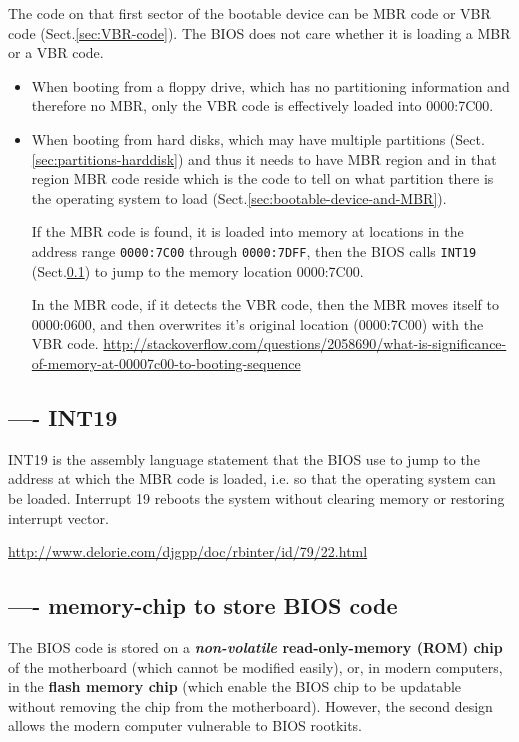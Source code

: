 The code on that first sector of the bootable device can be MBR code or VBR code
(Sect.\ref{sec:VBR-code}). The BIOS does not care whether it is loading a MBR or
a VBR code.
\begin{itemize}
  \item  When booting from a floppy drive, which has no partitioning information
  and therefore no MBR, only the VBR code is effectively loaded into 0000:7C00.

  \item When booting from hard disks, which may have multiple partitions
  (Sect.\ref{sec:partitions-harddisk}) and thus it needs to have MBR region
  and in that region MBR code reside which is the code to tell on what partition
  there is the operating system to load (Sect.\ref{sec:bootable-device-and-MBR}).
    
  If the MBR code is found, it is loaded into memory at locations in the address
  range \verb!0000:7C00! through \verb!0000:7DFF!, then the BIOS calls
  \verb!INT19! (Sect.\ref{sec:INT19}) to jump to the memory location 0000:7C00.
 
In the MBR code, if it detects the VBR code, then the MBR
moves itself to 0000:0600, and then overwrites it's original location
(0000:7C00) with the VBR code.
\url{http://stackoverflow.com/questions/2058690/what-is-significance-of-memory-at-00007c00-to-booting-sequence}
\end{itemize}

\subsection{---- INT19}
\label{sec:INT19}

INT19 is the assembly language statement that the BIOS use to jump to the 
address at which the MBR code is loaded, i.e. so that the operating system can
be loaded. Interrupt 19 reboots the system without clearing memory or restoring
interrupt vector.

\url{http://www.delorie.com/djgpp/doc/rbinter/id/79/22.html} 


\subsection{---- memory-chip to store BIOS code}

The BIOS code is stored on a {\bf {\it non-volatile} read-only-memory (ROM)
chip} of the motherboard (which cannot be modified easily), or, in modern
computers, in the {\bf flash memory chip} (which enable the BIOS chip to be
updatable without removing the chip from the motherboard). However, the second
design allows the modern computer vulnerable to BIOS rootkits.

